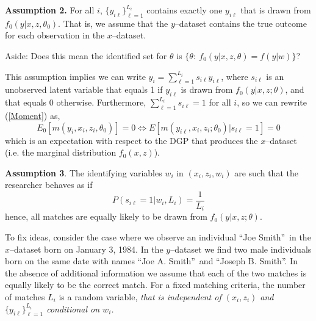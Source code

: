 \documentclass[12pt]{article}
\newcommand{\yiL}{\{y_{i\ell}\}_{\ell=1}^{L_i}}
\begin{document}
\textbf{Assumption 2.}  For all $i$, $\yiL$ contains exactly one $y_{i\ell}$ that is drawn from $f_0(y | x,z, \theta_0)$.  That is, we assume that the  $y$--dataset contains the true outcome for each observation in the $x$--dataset. 

Aside: Does this mean the identified set for $\theta$ is $\{ \theta:\ f_0(y | x, z, \theta) = f(y | w)\}$?
 
This assumption implies we can write $y_i = \sum_{\ell=1}^{L_i} s_{i\ell} y_{i\ell}$, where $s_{i\ell}$ is an unobserved latent variable that equals 1 if $y_{i\ell}$ is drawn from $f_0(y|x,z; \theta)$, and that equals 0 otherwise.  
Furthermore, $\sum_{\ell=1}^{L_i} s_{i\ell} = 1$ for all $i$, so we can rewrite (\ref{Moment}) as,
\begin{equation} E_0\left[m(y_i, x_i, z_i, \theta_0 )\right] = 0 \iff %
E\left[m(y_{i\ell},x_i,z_i; \theta_0) | s_{i\ell} =1 \right] = 0  \label{truemodel} \end{equation} 
which is an expectation with respect to the DGP that produces the $x$--dataset (i.e. the marginal distribution $f_0(x,z)$). 

\textbf{Assumption 3}. The identifying variables $w_i$ in $(x_i, z_i, w_i)$ are such that the researcher behaves as if
$$P(s_{i\ell}=1 | w_i, L_i) = \frac{1}{L_i}$$ 
hence, all matches are equally likely to be drawn from $f_0(y | x,z; \theta)$. 


To fix ideas, consider the case where we observe an individual
\textquotedblleft Joe Smith\textquotedblright\ in the $x$--dataset born on
January 3, 1984. In the $y$--dataset we find two male individuals born on the
same date with names \textquotedblleft Joe A. Smith\textquotedblright\ and
\textquotedblleft Joseph B. Smith\textquotedblright . In the absence of
additional information we assume that each of the two matches is equally
likely to be the correct match. For a fixed matching criteria, the number of
matches $L_{i}$ is a random variable, \textit{that is independent of $(x_i, z_i)$ and $\yiL$ conditional on $w_i$.  }
\end{document}
